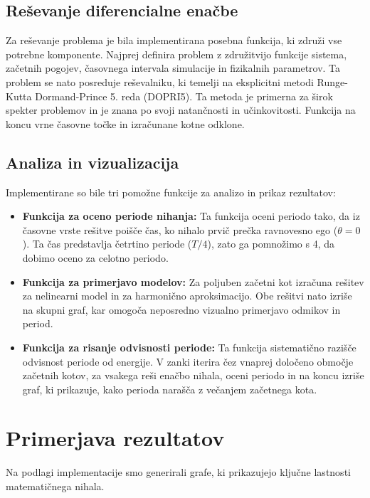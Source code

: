 \documentclass{article}
\begin{document}
\subsection{Reševanje diferencialne enačbe}
Za reševanje problema je bila implementirana posebna funkcija, ki združi vse potrebne
komponente. Najprej definira problem z združitvijo funkcije sistema, začetnih pogojev,
časovnega intervala simulacije in fizikalnih parametrov. Ta problem se nato posreduje
reševalniku, ki temelji na eksplicitni metodi Runge-Kutta Dormand-Prince 5. reda (DOPRI5).
Ta metoda je primerna za širok spekter problemov in je znana po svoji natančnosti in
učinkovitosti. Funkcija na koncu vrne časovne točke in izračunane kotne odklone.

\subsection{Analiza in vizualizacija}
Implementirane so bile tri pomožne funkcije za analizo in prikaz rezultatov:
\begin{itemize}
    \item \textbf{Funkcija za oceno periode nihanja:} Ta funkcija oceni periodo tako,
    da iz časovne vrste rešitve poišče čas, ko nihalo prvič prečka ravnovesno
    ego ($\theta=0$). Ta čas predstavlja četrtino periode ($T/4$), zato ga pomnožimo
    s 4, da dobimo oceno za celotno periodo.

    \item \textbf{Funkcija za primerjavo modelov:} Za poljuben začetni kot izračuna rešitev
    za nelinearni model in za harmonično aproksimacijo. Obe rešitvi nato izriše na skupni graf,
    kar omogoča neposredno vizualno primerjavo odmikov in period.

    \item \textbf{Funkcija za risanje odvisnosti periode:} Ta funkcija sistematično razišče
    odvisnost periode od energije. V zanki iterira čez vnaprej določeno območje začetnih kotov,
    za vsakega reši enačbo nihala, oceni periodo in na koncu izriše graf,
    ki prikazuje, kako perioda narašča z večanjem začetnega kota.
\end{itemize}

\section{Primerjava rezultatov}

Na podlagi implementacije smo generirali grafe, ki prikazujejo ključne lastnosti matematičnega nihala.
\end{document}
